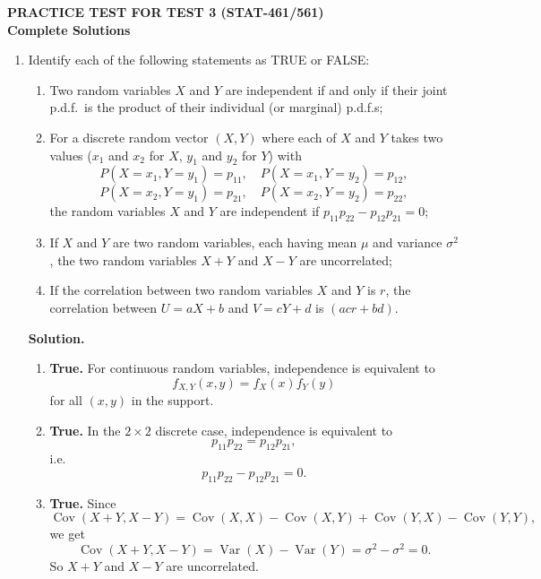 \documentclass[12pt]{article}
\begin{document}
\begin{center}
    {\Large \textbf{PRACTICE TEST FOR TEST 3 (STAT-461/561)}}\\[4pt]
    {\large \textbf{Complete Solutions}}
\end{center}

\begin{enumerate}[label=(\arabic*), leftmargin=*]

\item Identify each of the following statements as TRUE or FALSE:
\begin{enumerate}[label=(\alph*), itemsep=0.5em]
    \item Two random variables $X$ and $Y$ are independent if and only if their joint p.d.f.\ is the product of their individual (or marginal) p.d.f.s;
    \item For a discrete random vector $(X,Y)$ where each of $X$ and $Y$ takes two values ($x_1$ and $x_2$ for $X$, $y_1$ and $y_2$ for $Y$) with
    \[
    P(X=x_1 , Y=y_1)=p_{11},\quad P(X=x_1 , Y=y_2)=p_{12},
    \]
    \[
    P(X=x_2 , Y=y_1)=p_{21},\quad P(X=x_2 , Y=y_2)=p_{22},
    \]
    the random variables $X$ and $Y$ are independent if $p_{11}p_{22}-p_{12}p_{21}=0$;
    \item If $X$ and $Y$ are two random variables, each having mean $\mu$ and variance $\sigma^2$, the two random variables $X+Y$ and $X-Y$ are uncorrelated;
    \item If the correlation between two random variables $X$ and $Y$ is $r$, the correlation between $U=aX+b$ and $V=cY+d$ is $(acr+bd)$.
\end{enumerate}

\par\medskip
\noindent\textbf{Solution.}
\begin{enumerate}[label=(\alph*), itemsep=0.5em]
    \item \textbf{True.} For continuous random variables, independence is equivalent to
    \[
    f_{X,Y}(x,y)=f_X(x)f_Y(y)
    \]
    for all $(x,y)$ in the support.

    \item \textbf{True.} In the $2\times 2$ discrete case, independence is equivalent to
    \[
    p_{11}p_{22}=p_{12}p_{21},
    \]
    i.e.
    \[
    p_{11}p_{22}-p_{12}p_{21}=0.
    \]

    \item \textbf{True.} Since
    \[
    \operatorname{Cov}(X+Y,X-Y)
    =\operatorname{Cov}(X,X)-\operatorname{Cov}(X,Y)+\operatorname{Cov}(Y,X)-\operatorname{Cov}(Y,Y),
    \]
    we get
    \[
    \operatorname{Cov}(X+Y,X-Y)=\operatorname{Var}(X)-\operatorname{Var}(Y)=\sigma^2-\sigma^2=0.
    \]
    So $X+Y$ and $X-Y$ are uncorrelated.


\end{enumerate}
\end{enumerate}
\end{document}
